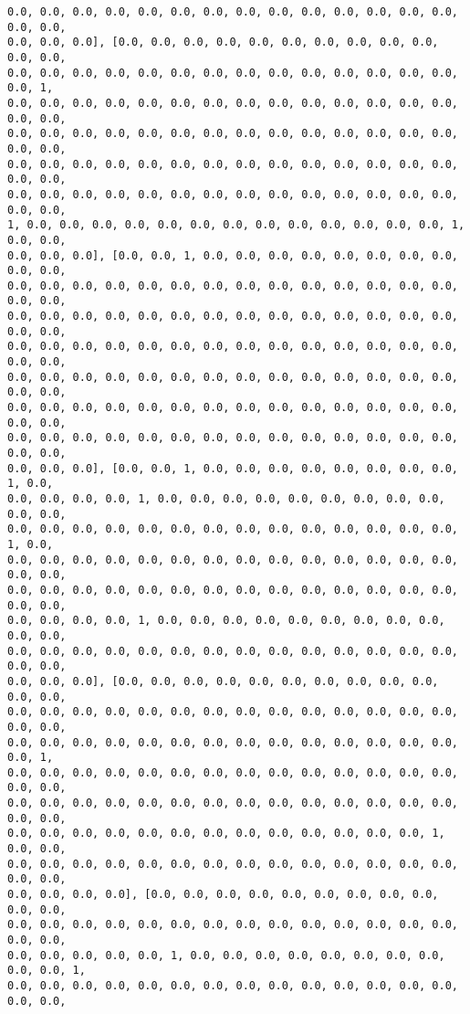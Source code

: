 \documentclass[11pt]{article}
\begin{document}
\begin{Verbatim}[commandchars=\\\{\}]
0.0, 0.0, 0.0, 0.0, 0.0, 0.0, 0.0, 0.0, 0.0, 0.0, 0.0, 0.0, 0.0, 0.0, 0.0, 0.0,
0.0, 0.0, 0.0], [0.0, 0.0, 0.0, 0.0, 0.0, 0.0, 0.0, 0.0, 0.0, 0.0, 0.0, 0.0,
0.0, 0.0, 0.0, 0.0, 0.0, 0.0, 0.0, 0.0, 0.0, 0.0, 0.0, 0.0, 0.0, 0.0, 0.0, 1,
0.0, 0.0, 0.0, 0.0, 0.0, 0.0, 0.0, 0.0, 0.0, 0.0, 0.0, 0.0, 0.0, 0.0, 0.0, 0.0,
0.0, 0.0, 0.0, 0.0, 0.0, 0.0, 0.0, 0.0, 0.0, 0.0, 0.0, 0.0, 0.0, 0.0, 0.0, 0.0,
0.0, 0.0, 0.0, 0.0, 0.0, 0.0, 0.0, 0.0, 0.0, 0.0, 0.0, 0.0, 0.0, 0.0, 0.0, 0.0,
0.0, 0.0, 0.0, 0.0, 0.0, 0.0, 0.0, 0.0, 0.0, 0.0, 0.0, 0.0, 0.0, 0.0, 0.0, 0.0,
1, 0.0, 0.0, 0.0, 0.0, 0.0, 0.0, 0.0, 0.0, 0.0, 0.0, 0.0, 0.0, 0.0, 1, 0.0, 0.0,
0.0, 0.0, 0.0], [0.0, 0.0, 1, 0.0, 0.0, 0.0, 0.0, 0.0, 0.0, 0.0, 0.0, 0.0, 0.0,
0.0, 0.0, 0.0, 0.0, 0.0, 0.0, 0.0, 0.0, 0.0, 0.0, 0.0, 0.0, 0.0, 0.0, 0.0, 0.0,
0.0, 0.0, 0.0, 0.0, 0.0, 0.0, 0.0, 0.0, 0.0, 0.0, 0.0, 0.0, 0.0, 0.0, 0.0, 0.0,
0.0, 0.0, 0.0, 0.0, 0.0, 0.0, 0.0, 0.0, 0.0, 0.0, 0.0, 0.0, 0.0, 0.0, 0.0, 0.0,
0.0, 0.0, 0.0, 0.0, 0.0, 0.0, 0.0, 0.0, 0.0, 0.0, 0.0, 0.0, 0.0, 0.0, 0.0, 0.0,
0.0, 0.0, 0.0, 0.0, 0.0, 0.0, 0.0, 0.0, 0.0, 0.0, 0.0, 0.0, 0.0, 0.0, 0.0, 0.0,
0.0, 0.0, 0.0, 0.0, 0.0, 0.0, 0.0, 0.0, 0.0, 0.0, 0.0, 0.0, 0.0, 0.0, 0.0, 0.0,
0.0, 0.0, 0.0], [0.0, 0.0, 1, 0.0, 0.0, 0.0, 0.0, 0.0, 0.0, 0.0, 0.0, 1, 0.0,
0.0, 0.0, 0.0, 0.0, 1, 0.0, 0.0, 0.0, 0.0, 0.0, 0.0, 0.0, 0.0, 0.0, 0.0, 0.0,
0.0, 0.0, 0.0, 0.0, 0.0, 0.0, 0.0, 0.0, 0.0, 0.0, 0.0, 0.0, 0.0, 0.0, 1, 0.0,
0.0, 0.0, 0.0, 0.0, 0.0, 0.0, 0.0, 0.0, 0.0, 0.0, 0.0, 0.0, 0.0, 0.0, 0.0, 0.0,
0.0, 0.0, 0.0, 0.0, 0.0, 0.0, 0.0, 0.0, 0.0, 0.0, 0.0, 0.0, 0.0, 0.0, 0.0, 0.0,
0.0, 0.0, 0.0, 0.0, 1, 0.0, 0.0, 0.0, 0.0, 0.0, 0.0, 0.0, 0.0, 0.0, 0.0, 0.0,
0.0, 0.0, 0.0, 0.0, 0.0, 0.0, 0.0, 0.0, 0.0, 0.0, 0.0, 0.0, 0.0, 0.0, 0.0, 0.0,
0.0, 0.0, 0.0], [0.0, 0.0, 0.0, 0.0, 0.0, 0.0, 0.0, 0.0, 0.0, 0.0, 0.0, 0.0,
0.0, 0.0, 0.0, 0.0, 0.0, 0.0, 0.0, 0.0, 0.0, 0.0, 0.0, 0.0, 0.0, 0.0, 0.0, 0.0,
0.0, 0.0, 0.0, 0.0, 0.0, 0.0, 0.0, 0.0, 0.0, 0.0, 0.0, 0.0, 0.0, 0.0, 0.0, 1,
0.0, 0.0, 0.0, 0.0, 0.0, 0.0, 0.0, 0.0, 0.0, 0.0, 0.0, 0.0, 0.0, 0.0, 0.0, 0.0,
0.0, 0.0, 0.0, 0.0, 0.0, 0.0, 0.0, 0.0, 0.0, 0.0, 0.0, 0.0, 0.0, 0.0, 0.0, 0.0,
0.0, 0.0, 0.0, 0.0, 0.0, 0.0, 0.0, 0.0, 0.0, 0.0, 0.0, 0.0, 0.0, 1, 0.0, 0.0,
0.0, 0.0, 0.0, 0.0, 0.0, 0.0, 0.0, 0.0, 0.0, 0.0, 0.0, 0.0, 0.0, 0.0, 0.0, 0.0,
0.0, 0.0, 0.0, 0.0], [0.0, 0.0, 0.0, 0.0, 0.0, 0.0, 0.0, 0.0, 0.0, 0.0, 0.0,
0.0, 0.0, 0.0, 0.0, 0.0, 0.0, 0.0, 0.0, 0.0, 0.0, 0.0, 0.0, 0.0, 0.0, 0.0, 0.0,
0.0, 0.0, 0.0, 0.0, 0.0, 1, 0.0, 0.0, 0.0, 0.0, 0.0, 0.0, 0.0, 0.0, 0.0, 0.0, 1,
0.0, 0.0, 0.0, 0.0, 0.0, 0.0, 0.0, 0.0, 0.0, 0.0, 0.0, 0.0, 0.0, 0.0, 0.0, 0.0,

\end{Verbatim}
\end{document}
